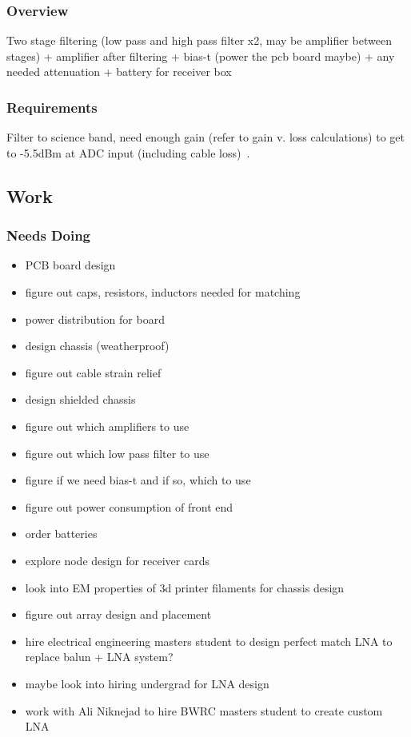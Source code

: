 \documentclass[11pt]{report}
\begin{document}
\subsubsection{Overview}

Two stage filtering (low pass and high pass filter x2, may be amplifier between 
stages) + amplifier after filtering + bias-t (power the pcb board maybe) + any 
needed attenuation + battery for receiver box

\subsubsection{Requirements}

Filter to science band, need enough gain (refer to gain v. loss calculations) 
to get to -5.5dBm at ADC input (including cable loss)~\citep{day2016}.

\subsection{Work}

\subsubsection{Needs Doing}
\begin{itemize}
 \item PCB board design
 \item figure out caps, resistors, inductors needed for matching
 \item power distribution for board
 \item design chassis (weatherproof)
 \item figure out cable strain relief
 \item design shielded chassis
 \item figure out which amplifiers to use
 \item figure out which low pass filter to use
 \item figure if we need bias-t and if so, which to use
 \item figure out power consumption of front end
 \item order batteries
 \item explore node design for receiver cards
 \item look into EM properties of 3d printer filaments for chassis design
 \item figure out array design and placement
 \item hire electrical engineering masters student to design perfect match LNA 
  to replace balun + LNA system?
 \item maybe look into hiring undergrad for LNA design
 \item work with Ali Niknejad to hire BWRC masters student to create custom LNA
\end{itemize}
\end{document}
